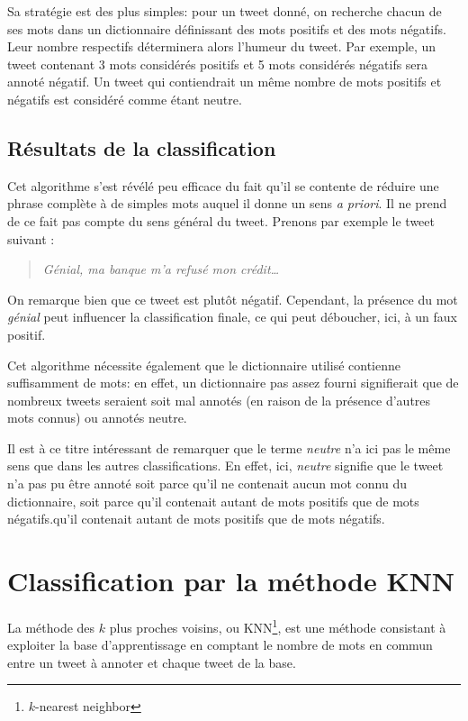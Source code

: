 \documentclass[12pt,a4paper]{report}
\begin{document}
Sa stratégie est des plus simples: pour un tweet donné, on recherche
chacun de ses mots dans un dictionnaire définissant des mots positifs et des
mots négatifs. Leur nombre respectifs déterminera alors l'humeur du tweet. Par
exemple, un tweet contenant 3 mots considérés positifs et 5 mots considérés
négatifs sera annoté négatif. Un tweet qui contiendrait un même nombre de mots
positifs et négatifs est considéré comme étant neutre.

\subsection{Résultats de la classification}
Cet algorithme s'est révélé peu efficace du fait qu'il se contente de réduire
une phrase complète à de simples mots auquel il donne un sens \textit{a priori}.
Il ne prend de ce fait pas compte du sens général du tweet. Prenons par exemple
le tweet suivant :

\begin{quote}
    \textit{Génial, ma banque m'a refusé mon crédit…}
\end{quote}

On remarque bien que ce tweet est plutôt négatif. Cependant, la présence du mot
\textit{génial} peut influencer la classification finale, ce qui peut déboucher,
ici, à un faux positif.

Cet algorithme nécessite également que le dictionnaire utilisé contienne
suffisamment de mots: en effet, un dictionnaire pas assez fourni signifierait
que de nombreux tweets seraient soit mal annotés (en raison de la présence
d'autres mots connus) ou annotés neutre.

Il est à ce titre intéressant de remarquer que le terme \textit{neutre} n'a ici
pas le même sens que dans les autres classifications. En effet, ici,
\textit{neutre} signifie que le tweet n'a pas pu être annoté soit parce qu'il ne
contenait aucun mot connu du dictionnaire, soit parce qu'il contenait autant de
mots positifs que de mots négatifs.qu'il contenait autant de mots positifs que
de mots négatifs.

\section{Classification par la méthode KNN}
La méthode des $k$ plus proches voisins, ou KNN\footnote{$k$-nearest neighbor},
est une méthode consistant à exploiter la base d'apprentissage en comptant le
nombre de mots en commun entre un tweet à annoter et chaque tweet de la base.
\end{document}
